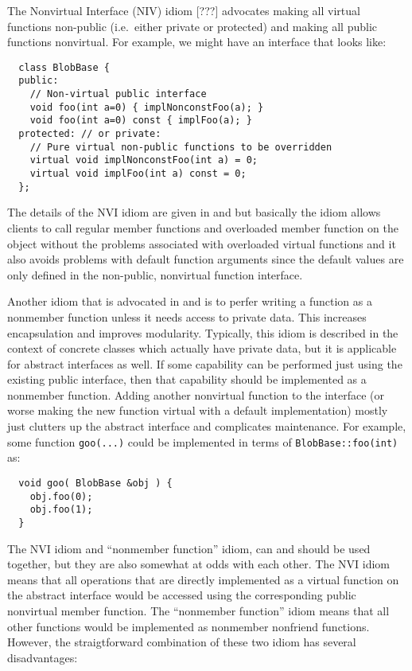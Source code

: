 \documentclass[pdf,ps2pdf,11pt]{SANDreport}
\begin{document}
The Nonvirtual Interface (NIV) idiom [???] advocates making all virtual
functions non-public (i.e.\ either private or protected) and making all public
functions nonvirtual.  For example, we might have an interface that looks like:

{\small\begin{verbatim}
  class BlobBase {
  public:
    // Non-virtual public interface
    void foo(int a=0) { implNonconstFoo(a); }
    void foo(int a=0) const { implFoo(a); }
  protected: // or private:
    // Pure virtual non-public functions to be overridden
    virtual void implNonconstFoo(int a) = 0;
    virtual void implFoo(int a) const = 0;
  };
\end{verbatim}}

The details of the NVI idiom are given in {}\cite[Item
???]{C++CodingStandards05} and {}\cite[Item ???]{EffectiveC++3rd??} but
basically the idiom allows clients to call regular member functions and
overloaded member function on the object without the problems associated with
overloaded virtual functions and it also avoids problems with default function
arguments since the default values are only defined in the non-public,
nonvirtual function interface.

Another idiom that is advocated in {}\cite[Item 44]{C++CodingStandards05} and
{}\cite[Item ???]{EffectiveC++3rd??} is to perfer writing a function as a
nonmember function unless it needs access to private data.  This increases
encapsulation and improves modularity.  Typically, this idiom is described in
the context of concrete classes which actually have private data, but it is
applicable for abstract interfaces as well.  If some capability can be
performed just using the existing public interface, then that capability
should be implemented as a nonmember function.  Adding another nonvirtual
function to the interface (or worse making the new function virtual with a
default implementation) mostly just clutters up the abstract interface and
complicates maintenance.  For example, some function {}\texttt{goo(...)} could
be implemented in terms of {}\texttt{BlobBase\-::foo(int)} as:

{\small\begin{verbatim}
  void goo( BlobBase &obj ) {
    obj.foo(0);
    obj.foo(1);
  }
\end{verbatim}}

The NVI idiom and ``nonmember function'' idiom, can and should be used
together, but they are also somewhat at odds with each other.  The NVI idiom
means that all operations that are directly implemented as a virtual function
on the abstract interface would be accessed using the corresponding public
nonvirtual member function.  The ``nonmember function'' idiom means that all
other functions would be implemented as nonmember nonfriend functions.
However, the straigtforward combination of these two idiom has several
disadvantages:
\end{document}
